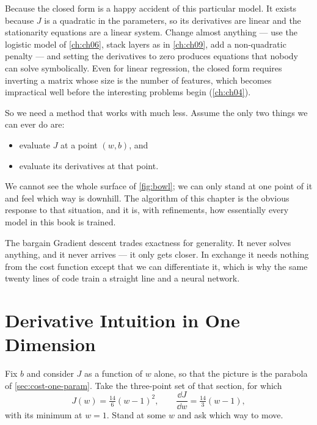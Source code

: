 Because the closed form is a happy accident of this particular model. It exists
because $J$ is a quadratic in the parameters, so its derivatives are linear and
the stationarity equations are a linear system. Change almost anything --- use
the logistic model of \cref{ch:ch06}, stack layers as in \cref{ch:ch09}, add a
non-quadratic penalty --- and setting the derivatives to zero produces equations
that nobody can solve symbolically. Even for linear regression, the closed form
requires inverting a matrix whose size is the number of features, which becomes
impractical well before the interesting problems begin (\cref{ch:ch04}).

So we need a method that works with much less. Assume the only two things we can
ever do are:

\begin{itemize}
  \item evaluate $J$ at a point $(w,b)$, and
  \item evaluate its derivatives at that point.
\end{itemize}

\noindent We cannot see the whole surface of \cref{fig:bowl}; we can only stand
at one point of it and feel which way is downhill. The algorithm of this chapter
is the obvious response to that situation, and it is, with refinements, how
essentially every model in this book is trained.

\begin{keyinsight}{The bargain}
Gradient descent trades exactness for generality. It never solves anything, and
it never arrives --- it only gets closer. In exchange it needs nothing from the
cost function except that we can differentiate it, which is why the same twenty
lines of code train a straight line and a neural network.
\end{keyinsight}

\section{Derivative Intuition in One Dimension}
\label{sec:derivative-intuition}

Fix $b$ and consider $J$ as a function of $w$ alone, so that the picture is the
parabola of \cref{sec:cost-one-param}. Take the three-point set of that section,
for which
\[
  J(w) = \tfrac{14}{6}(w-1)^2,
  \qquad
  \frac{\dd J}{\dd w} = \tfrac{14}{3}(w-1),
\]
with its minimum at $w = 1$. Stand at some $w$ and ask which way to move.

